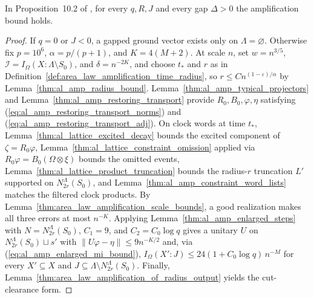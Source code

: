 \begin{theorem}
    \label{thm:area_law_amplification}
    \leanok
    In Proposition~10.2 of \cite{OpenAI2026AreaLaw}, for every $q,R,J$ and every
    gap $\Delta>0$ the amplification bound holds.
\end{theorem}
\begin{proof}
    \leanok
    If $q=0$ or $J<0$, a gapped ground vector exists only on $\Lambda=\varnothing$.
    Otherwise fix $p=10^6$, $\alpha=p/(p+1)$, and $K=4(M+2)$. At scale $n$, set
    $w=n^{3/5}$, $\mathcal I=I_\Omega(X:\Lambda\setminus S_0)$, and $\delta=n^{-2K}$,
    and choose $t_*$ and $r$ as in
    Definition~\ref{def:area_law_amplification_time_radius}, so
    $r\le Cn^{(1-\varepsilon)/\alpha}$ by Lemma~\ref{thm:al_amp_radius_bound}.
    Lemma~\ref{thm:al_amp_typical_projectors} and
    Lemma~\ref{thm:al_amp_restoring_transport} provide $R_0,B_0,\varphi,\eta$
    satisfying (\ref{eq:al_amp_restoring_transport_norms}) and
    (\ref{eq:al_amp_restoring_transport_adj}). On clock words at time $t_*$,
    Lemma~\ref{thm:al_lattice_excited_decay} bounds the excited component of
    $\zeta=R_0\varphi$, Lemma~\ref{thm:al_lattice_constraint_omission} applied
    via $R_0\varphi=B_0(\Omega\otimes\xi)$ bounds the omitted events,
    Lemma~\ref{thm:al_lattice_product_truncation} bounds the radius-$r$
    truncation $L'$ supported on $N_{2r}^\Lambda(S_0)$, and
    Lemma~\ref{thm:al_amp_constraint_word_lists} matches the filtered clock
    products. By Lemma~\ref{thm:area_law_amplification_scale_bounds}, a good
    realization makes all three errors at most $n^{-K}$. Applying
    Lemma~\ref{thm:al_amp_enlarged_steps} with $N=N_{2r}^\Lambda(S_0)$,
    $C_1=9$, and $C_2=C_0\log q$ gives a unitary $U$ on
    $N_{2r}^\Lambda(S_0)\sqcup s'$ with $\|U\varphi-\eta\|\le 9n^{-K/2}$ and,
    via (\ref{eq:al_amp_enlarged_mi_bound}),
    $I_\Omega(X':J)\le 24(1+C_0\log q)\,n^{-M}$ for every $X'\subseteq X$ and
    $J\subseteq\Lambda\setminus N_{2r}^\Lambda(S_0)$. Finally,
    Lemma~\ref{thm:area_law_amplification_of_radius_output} yields the
    cut-clearance form.
\end{proof}

